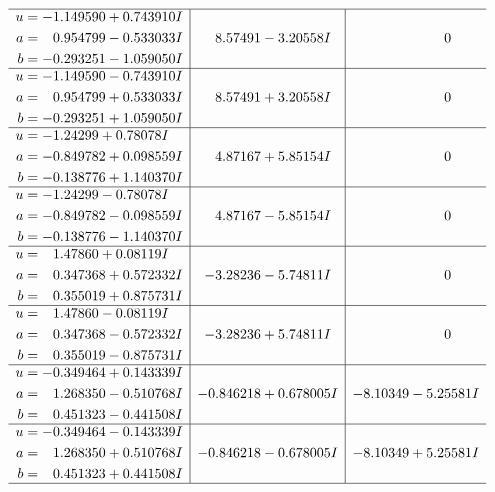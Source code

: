 \documentclass[1p]{elsarticle_modified}
\theoremstyle{definition}
\begin{document}
$$\begin{array}{c|c|c}
 \hline 
\begin{aligned}
u &= -1.149590 + 0.743910 I \\
a &= \phantom{-}0.954799 - 0.533033 I \\
b &= -0.293251 - 1.059050 I\end{aligned}
 & \phantom{-}8.57491 - 3.20558 I & \phantom{-0.000000 } 0 \\ \hline\begin{aligned}
u &= -1.149590 - 0.743910 I \\
a &= \phantom{-}0.954799 + 0.533033 I \\
b &= -0.293251 + 1.059050 I\end{aligned}
 & \phantom{-}8.57491 + 3.20558 I & \phantom{-0.000000 } 0 \\ \hline\begin{aligned}
u &= -1.24299 + 0.78078 I \\
a &= -0.849782 + 0.098559 I \\
b &= -0.138776 + 1.140370 I\end{aligned}
 & \phantom{-}4.87167 + 5.85154 I & \phantom{-0.000000 } 0 \\ \hline\begin{aligned}
u &= -1.24299 - 0.78078 I \\
a &= -0.849782 - 0.098559 I \\
b &= -0.138776 - 1.140370 I\end{aligned}
 & \phantom{-}4.87167 - 5.85154 I & \phantom{-0.000000 } 0 \\ \hline\begin{aligned}
u &= \phantom{-}1.47860 + 0.08119 I \\
a &= \phantom{-}0.347368 + 0.572332 I \\
b &= \phantom{-}0.355019 + 0.875731 I\end{aligned}
 & -3.28236 - 5.74811 I & \phantom{-0.000000 } 0 \\ \hline\begin{aligned}
u &= \phantom{-}1.47860 - 0.08119 I \\
a &= \phantom{-}0.347368 - 0.572332 I \\
b &= \phantom{-}0.355019 - 0.875731 I\end{aligned}
 & -3.28236 + 5.74811 I & \phantom{-0.000000 } 0 \\ \hline\begin{aligned}
u &= -0.349464 + 0.143339 I \\
a &= \phantom{-}1.268350 - 0.510768 I \\
b &= \phantom{-}0.451323 - 0.441508 I\end{aligned}
 & -0.846218 + 0.678005 I & -8.10349 - 5.25581 I \\ \hline\begin{aligned}
u &= -0.349464 - 0.143339 I \\
a &= \phantom{-}1.268350 + 0.510768 I \\
b &= \phantom{-}0.451323 + 0.441508 I\end{aligned}
 & -0.846218 - 0.678005 I & -8.10349 + 5.25581 I\\
 \hline 
 \end{array}$$\newpage\newpage\renewcommand{\arraystretch}{1}
\end{document}
